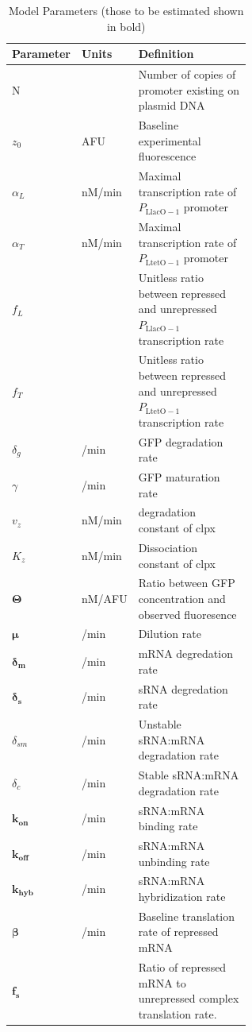 \documentclass[10pt,journal]{./IEEE_latex_class/IEEEtran}
\begin{document}
\begin{table}[h]
\renewcommand{\arraystretch}{1.3}
\caption{Model Parameters (those to be estimated shown in bold)}
\label{ModelParameters}
\centering
\begin{tabular}{| l | l | p{0.6\linewidth} |}
\hline \textbf{Parameter} &  \textbf{Units} & \textbf{Definition}  \\
\hline \hline N & & Number of copies of promoter existing on plasmid DNA  \\
\hline $z_{0}$ &  AFU & Baseline experimental fluorescence  \\
\hline $\alpha_{L}$ & nM/min & Maximal transcription rate of $P_\mathrm{LlacO-1}$ promoter\\
\hline $\alpha_{T}$  &  nM/min  & Maximal transcription rate of $P_{\mathrm{LtetO-1}}$ promoter \\
\hline $f_{L}$ &  & Unitless ratio between repressed and unrepressed $P_\mathrm{LlacO-1}$ transcription rate   \\ 
\hline $f_{T}$ &  & Unitless ratio between repressed and unrepressed $P_{\mathrm{LtetO-1}}$ transcription rate  \\
\hline $\delta_{g}$  & /min  & GFP degradation rate  \\
\hline $\gamma$ &  /min & GFP maturation rate  \\
\hline $v_{z}$ & nM/min & degradation constant of clpx  \\
\hline $K_{z}$   &   nM/min & Dissociation constant of clpx  \\
\hline $\boldsymbol{\Theta}$  &   nM/AFU & Ratio between GFP concentration and observed fluoresence  \\
\hline $\boldsymbol{\mu}$ &  /min & Dilution rate  \\
\hline $\boldsymbol{\delta_{m}}$ &  /min & mRNA degredation rate  \\
\hline $\boldsymbol{\delta_{s}}$ &  /min & sRNA degredation rate  \\
\hline $\delta_{sm}$ &  /min & Unstable sRNA:mRNA degradation rate  \\
\hline $\delta_{c}$ &  /min & Stable sRNA:mRNA degradation rate  \\
\hline $\boldsymbol{k_{on}}$ &   /min & sRNA:mRNA binding rate \\
\hline $\boldsymbol{k_{off}}$ &  /min & sRNA:mRNA unbinding rate \\
\hline $\boldsymbol{k_{hyb}}$ &  /min & sRNA:mRNA hybridization rate \\
\hline $\boldsymbol{\beta}$ &   /min & Baseline translation rate of repressed mRNA \\
\hline $\boldsymbol{f_{s}}$ & & Ratio of repressed mRNA to unrepressed complex translation rate. \\
\hline
\end{tabular}
\end{table}
\end{document}
